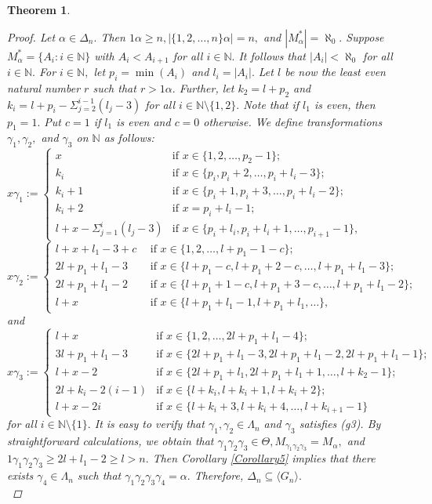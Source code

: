 \documentclass[11pt]{article}
\theoremstyle{plain}
\newtheorem{theorem}{Theorem}[section]
\theoremstyle{definition}
\begin{document}
\begin{theorem}
\begin{proof}
Let $\alpha\in\Delta_{n}.$ Then $1\alpha\geq n, \left\vert\{1,2,\ldots,n\}\alpha\right\vert=n,$ and $\left\vert M_{\alpha}^{*}\right\vert=\aleph_{0}.$ Suppose $M_{\alpha}^{*}=\{A_{i}:i\in\mathbb{N}\}$ with $A_{i}<A_{i+1}$ for all $i\in\mathbb{N}.$ It follows that $\left\vert A_{i}\right\vert<\aleph_{0}$ for all $i\in\mathbb{N}.$ For $i\in\mathbb{N},$ let $p_{i}=\min(A_{i})$ and $l_{i}=\left\vert A_{i}\right\vert.$ Let $l$ be now the least even natural number $r$ such that $r>1\alpha.$ Further, let $k_{2}=l+p_{2}$ and $k_{i}=l+p_{i}-\Sigma_{j=2}^{i-1}(l_{j}-3)$ for all $i\in\mathbb{N}\setminus\{1,2\}.$ Note that if $l_{1}$ is even, then $p_{1}=1.$ Put $c=1$ if $l_{1}$ is even and $c=0$ otherwise. We define transformations $\gamma_{1},\gamma_{2},$ and $\gamma_{3}$ on $\mathbb{N}$ as follows:
$$x\gamma_{1}:=\begin{cases}
x~~~~~~&\text{if }x\in\{1,2,\ldots,p_{2}-1\};\\
k_{i}&\text{if }x\in\{p_{i},p_{i}+2,\ldots,p_{i}+l_{i}-3\};\\
k_{i}+1&\text{if }x\in\{p_{i}+1,p_{i}+3,\ldots,p_{i}+l_{i}-2\};\\
k_{i}+2&\text{if }x=p_{i}+l_{i}-1;\\
l+x-\Sigma_{j=1}^{i}(l_{j}-3)&\text{if }x\in\{p_{i}+l_{i},p_{i}+l_{i}+1,\ldots,p_{i+1}-1\},~~~~~~~~~~~~~~~~~~~
\end{cases}$$
$$x\gamma_{2}:=\begin{cases}
l+x+l_{1}-3+c~~&\text{if }x\in\{1,2,\ldots,l+p_{1}-1-c\};\\
2l+p_{1}+l_{1}-3&\text{if }x\in\{l+p_{1}-c,l+p_{1}+2-c,\ldots,l+p_{1}+l_{1}-3\};\\
2l+p_{1}+l_{1}-2&\text{if }x\in\{l+p_{1}+1-c,l+p_{1}+3-c,\ldots,l+p_{1}+l_{1}-2\};\\
l+x&\text{if }x\in\{l+p_{1}+l_{1}-1,l+p_{1}+l_{1},\ldots\},
\end{cases}$$
and
$$x\gamma_{3}:=\begin{cases}
l+x&\text{if }x\in\{1,2,\ldots,2l+p_{1}+l_{1}-4\};\\
3l+p_{1}+l_{1}-3&\text{if }x\in\{2l+p_{1}+l_{1}-3,2l+p_{1}+l_{1}-2,2l+p_{1}+l_{1}-1\};\\
l+x-2&\text{if }x\in\{2l+p_{1}+l_{1},2l+p_{1}+l_{1}+1,\ldots,l+k_{2}-1\};\\
2l+k_{i}-2(i-1)&\text{if }x\in\{l+k_{i},l+k_{i}+1,l+k_{i}+2\};\\
l+x-2i&\text{if }x\in\{l+k_{i}+3,l+k_{i}+4,\ldots,l+k_{i+1}-1\}
\end{cases}$$
for all $i\in\mathbb{N}\setminus\{1\}.$ It is easy to verify that $\gamma_{1},\gamma_{2}\in\Lambda_{n}$ and $\gamma_{3}$ satisfies (g3). By straightforward calculations, we obtain that $\gamma_{1}\gamma_{2}\gamma_{3}\in\Theta,M_{\gamma_{1}\gamma_{2}\gamma_{3}}=M_{\alpha},$ and $1\gamma_{1}\gamma_{2}\gamma_{3}\geq 2l+l_{1}-2\geq l>n.$ Then Corollary \ref{Corollary5} implies that there exists $\gamma_{4}\in\Lambda_{n}$ such that $\gamma_{1}\gamma_{2}\gamma_{3}\gamma_{4}=\alpha.$ Therefore, $\Delta_{n}\subseteq \langle G_{n}\rangle.$\\


\end{proof}
\end{theorem}
\end{document}
